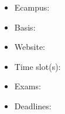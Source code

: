 \begin{tcolorbox}[enhanced,breakable,
	title=General Information,frame style={color=mycolor}]
    \begin{itemize}
        \item Ecampus: \url{}
        \item Basis: \url{}
        \item Website: \url{}
        \item Time slot(s): 
        \item Exams: 
        \item Deadlines:
    \end{itemize}
\end{tcolorbox}